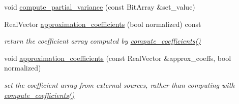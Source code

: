 \begin{DoxyCompactItemize}
\item 
void \hyperlink{classPecos_1_1NodalInterpPolyApproximation_a6eb2548a8c786f48478fabb6377be779}{compute\+\_\+partial\+\_\+variance} (const Bit\+Array \&set\+\_\+value)
\item 
Real\+Vector \hyperlink{classPecos_1_1NodalInterpPolyApproximation_ac64f16ff9fbfb80c4bafa969b4a92e1d}{approximation\+\_\+coefficients} (bool normalized) const \label{classPecos_1_1NodalInterpPolyApproximation_ac64f16ff9fbfb80c4bafa969b4a92e1d}

\begin{DoxyCompactList}\small\item\em return the coefficient array computed by \hyperlink{classPecos_1_1NodalInterpPolyApproximation_aef8f0c32bdeff7756a9c614607c03058}{compute\+\_\+coefficients()} \end{DoxyCompactList}\item 
void \hyperlink{classPecos_1_1NodalInterpPolyApproximation_a2e7b82322962df3fd036b9e0783d8fc9}{approximation\+\_\+coefficients} (const Real\+Vector \&approx\+\_\+coeffs, bool normalized)\label{classPecos_1_1NodalInterpPolyApproximation_a2e7b82322962df3fd036b9e0783d8fc9}

\begin{DoxyCompactList}\small\item\em set the coefficient array from external sources, rather than computing with \hyperlink{classPecos_1_1NodalInterpPolyApproximation_aef8f0c32bdeff7756a9c614607c03058}{compute\+\_\+coefficients()} \end{DoxyCompactList}\end{DoxyCompactItemize}
